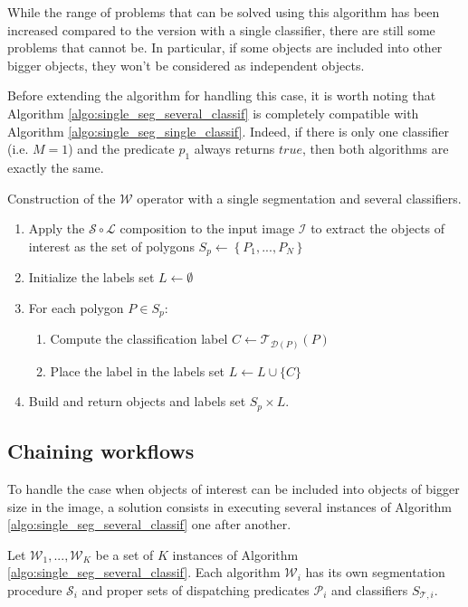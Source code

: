 While the range of problems that can be solved using this algorithm has been increased compared to the version with a single classifier, there are still some problems that cannot be. In particular, if some objects are included into other bigger objects, they won't be considered as independent objects. 

Before extending the algorithm for handling this case, it is worth noting that Algorithm \ref{algo:single_seg_several_classif} is completely compatible with Algorithm \ref{algo:single_seg_single_classif}. Indeed, if there is only one classifier (i.e. $M = 1$) and the predicate $p_1$ always returns $true$, then both algorithms are exactly the same. 

\begin{algorithm}\label{algo:single_seg_several_classif}
Construction of the $\mathcal{W}$ operator with a single segmentation and several classifiers. 
\begin{enumerate}
	\item Apply the $\mathcal{S} \circ \mathcal{L}$ composition to the input image $\mathcal{I}$ to extract the objects of interest as the set of polygons $S_p \leftarrow \left\{P_1, ..., P_N \right\}$
	\item Initialize the labels set $L \leftarrow \emptyset$
	\item For each polygon $P \in S_p$:
	\begin{enumerate}
		\item Compute the classification label $C \leftarrow \mathcal{T}_{\mathcal{D}(P)}(P)$
		\item Place the label in the labels set $L \leftarrow L \cup \{C\}$
	\end{enumerate}
	\item Build and return objects and labels set $S_p \times L$.
\end{enumerate}
\end{algorithm}

\subsection{Chaining workflows}

To handle the case when objects of interest can be included into objects of bigger size in the image, a solution consists in executing several instances of Algorithm \ref{algo:single_seg_several_classif} one after another. 

\begin{definition}\label{def:several_w_op}
	Let $\mathcal{W}_1, ..., \mathcal{W}_K$ be a set of $K$ instances of Algorithm \ref{algo:single_seg_several_classif}. Each algorithm $\mathcal{W}_i$ has its own segmentation procedure $\mathcal{S}_i$ and proper sets of dispatching predicates $\mathcal{P}_i$ and classifiers $S_{\mathcal{T},i}$.
\end{definition}

